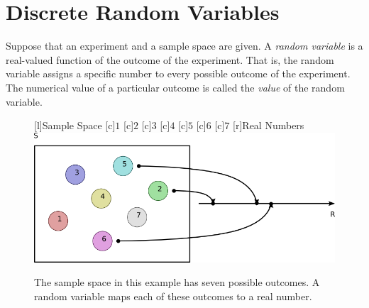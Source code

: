 \chapter{Discrete Random Variables}
\label{chapter:DiscreteRandomVariables}

Suppose that an experiment and a sample space are given.
A \emph{random variable} is a real-valued function of the outcome of the experiment. 
That is, the random variable assigns a specific number to every possible outcome of the experiment.
The numerical value of a particular outcome is called the \emph{value} of the random variable. 

\begin{figure}[ht]
\begin{center}
\begin{psfrags}
[l]{Sample Space}
[c]{$1$}
[c]{$2$}
[c]{$3$}
[c]{$4$}
[c]{$5$}
[c]{$6$}
[c]{$7$}
[r]{Real Numbers}
\includegraphics[width=13.20cm]{Figures/5Chapter/rv}
\caption{The sample space in this example has seven possible outcomes.
A random variable maps each of these outcomes to a real number.}
\end{psfrags}
\end{center}
\end{figure}

